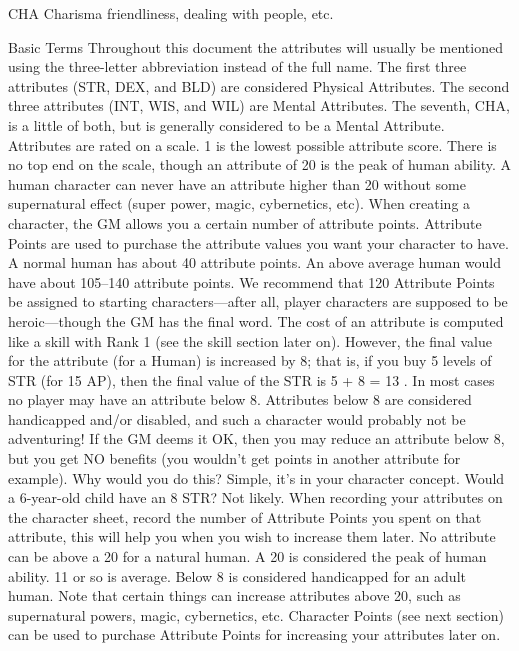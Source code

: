 \documentclass[twoside]{book}
\begin{document}
                  
                   CHA   
                   Charisma   
                     friendliness, dealing with people, etc.
                     
                  
                
              Basic Terms  
             Throughout this document the attributes will usually
               be mentioned using the three-letter abbreviation instead
               of the full name.  The first three attributes (STR, DEX, and BLD) are
               considered Physical Attributes. The second three
               attributes (INT, WIS, and WIL) are Mental Attributes. The
               seventh, CHA, is a little of both, but is generally
               considered to be a Mental Attribute.  Attributes are rated on a scale. 1 is the lowest
               possible attribute score. There is no top end on the
               scale, though an attribute of 20 is the peak of human
               ability. A human character can never have an attribute
               higher than 20 without some supernatural effect (super
               power, magic, cybernetics, etc).  When creating a character, the GM allows you a
               certain number of attribute points. Attribute Points are
               used to purchase the attribute values you want your
               character to have. A normal human has about 40 attribute
               points. An above average human would have about
               105–140 attribute points. We recommend that 120
               Attribute Points be assigned to starting
               characters—after all, player characters are supposed
               to be heroic—though the GM has the final word.
                The cost of an attribute is computed like a skill
              with Rank 1 (see the skill section later on). However, the
              final value for the attribute (for a Human) is increased by
              8; that is, if you buy 5 levels of STR (for 15 AP), then
              the final value of the STR is  5  +
               8  =    13 .
             In most cases no player may have an attribute below
               8. Attributes below 8 are considered handicapped and/or
               disabled, and such a character would probably not be
               adventuring!  If the GM deems it OK, then you may reduce an
               attribute below 8, but you get NO benefits (you
               wouldn’t get points in another attribute for
               example). Why would you do this? Simple, it’s in
               your character concept. Would a 6-year-old child have an 8
               STR? Not likely.  When recording your attributes on the character
               sheet, record the number of Attribute Points you spent on
               that attribute, this will help you when you wish to
               increase them later.  No attribute can be above a 20 for a natural human.
               A 20 is considered the peak of human ability. 11 or so is
               average. Below 8 is considered handicapped for an adult
               human. Note that certain things can increase attributes
               above 20, such as supernatural powers, magic, cybernetics,
               etc.  Character Points (see next section) can be used to
               purchase Attribute Points for increasing your attributes
               later on. 
\end{document}
